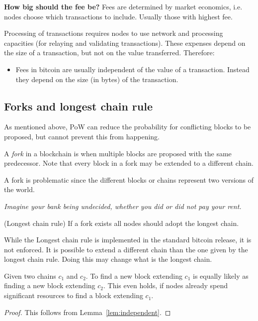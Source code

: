
\begin{note} \textbf{How big should the fee be?}
Fees are determined by market economics, i.e. nodes choose which transactions to include. Usually those with highest fee.
	
Processing of transactions requires nodes to use network and processing capacities (for relaying and validating transactions). These expenses depend on the size of a transaction, but not on the value transferred. Therefore:
\begin{itemize}
	\item Fees in bitcoin are usually independent of the value of a transaction. Instead they depend on the size (in bytes) of the transaction.
\end{itemize}
\end{note}

\subsection{Forks and longest chain rule}
As mentioned above, PoW can reduce the probability for conflicting blocks to be proposed, but cannot prevent this from happening.

\begin{definition} A \emph{fork} in a blockchain is when multiple blocks are proposed with the same predecessor. Note that every block in a fork may be extended to a different chain.
\end{definition}

A fork is problematic since the different blocks or chains represent two versions of the world. 
	
\emph{Imagine your bank being undecided, whether you did or did not pay your rent.}

\begin{definition} (Longest chain rule) If a fork exists all nodes should adopt the longest chain.
\end{definition}

\begin{note} While the Longest chain rule is implemented in the standard bitcoin release, it is not enforced. It is possible to extend a different chain than the one given by the longest chain rule. Doing this may change what is the longest chain. 
\end{note}

\begin{lem}
	Given two chains $c_1$ and $c_2$. To find a new block extending $c_1$ is equally likely as finding a new block extending $c_2$. This even holds, if nodes already spend significant resources to find a block extending $c_1$.
\end{lem}
\begin{proof} This follows from Lemma~\ref{lem:independent}.
\end{proof}

